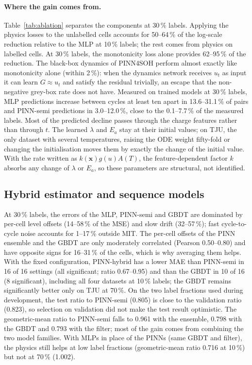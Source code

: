 \documentclass[11pt,a4paper]{article}
\begin{document}
\paragraph{Where the gain comes from.} Table~\ref{tab:ablation} separates the components at 30\,\% labels. Applying the
physics losses to the unlabelled cells accounts for 50--64\,\% of the log-scale reduction relative to the MLP at
10\,\% labels; the rest comes from physics on labelled cells. At 30\,\% labels, the monotonicity loss alone provides
62--95\,\% of the reduction. The black-box dynamics of PINN4SOH perform almost exactly like monotonicity alone (within
2\,\%): when the dynamics network receives $u_t$ as input it can learn $G \approx u_t$ and satisfy the residual trivially,
an escape that the non-negative grey-box rate does not have. Measured on trained models at 30\,\% labels, MLP
predictions increase between cycles at least ten apart in 13.6--31.1\,\% of pairs and PINN-semi predictions in
3.0--12.0\,\%, close to the 0.1--7.7\,\% of the measured labels. Most of the predicted decline passes through the
charge features rather than through $t$. The learned $\lambda$ and $E_a$ stay at their initial values; on TJU, the only
dataset with several temperatures, raising the ODE weight fifty-fold or changing the initialisation moves them by
exactly the change of the initial value. With the rate written as $k(\mathbf{x})g(u)A(T)$, the feature-dependent factor
$k$ absorbs any change of $\lambda$ or $E_a$, so these parameters are structural, not identified.



\subsection{Hybrid estimator and sequence models}\label{sec:hybrid}
At 30\,\% labels, the errors of the MLP, PINN-semi and GBDT are dominated by per-cell level offsets (14--58\,\% of
the MSE) and slow drift (32--57\,\%); fast cycle-to-cycle noise accounts for 1--17\,\% outside MIT. The per-cell offsets of the PINN ensemble and the GBDT are
only moderately correlated (Pearson 0.50--0.80) and have opposite signs for 16--31\,\% of the cells, which is why
averaging them helps. With the fixed configuration, PINN-hybrid has a lower MAE than PINN-semi in 16 of 16 settings (all
significant; ratio 0.67--0.95) and than the GBDT in 10 of 16 (8 significant), including all four datasets at 10\,\%
labels; the GBDT remains significantly better only on TJU at 70\,\%. On the two label fractions used during
development, the test ratio to PINN-semi (0.805) is close to the validation ratio (0.823), so selection on validation
did not make the test result optimistic. The geometric-mean ratio to PINN-semi falls to 0.961 with the ensemble, 0.798
with the GBDT and 0.793 with the filter; most of the gain comes from combining the two model families. With MLPs in
place of the PINNs (same GBDT and filter), the physics still helps at low label fractions (geometric-mean ratio 0.716
at 10\,\%) but not at 70\,\% (1.002).
\end{document}
